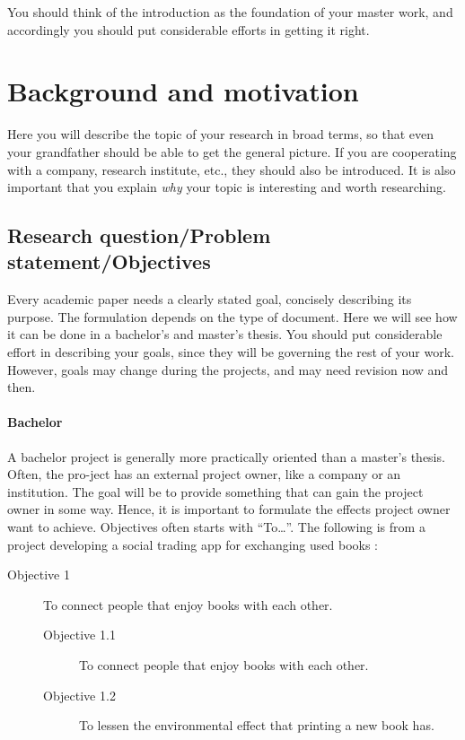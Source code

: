 You should think of the introduction  as the foundation of your master work, and accordingly you should put considerable efforts in getting it right. 


\section{Background and motivation}
\label{sec:background-motivation}

Here you will describe the topic of your research in broad terms, so that even your grandfather should be able to get the general picture. If you are cooperating with a company, research institute, etc., they should also be introduced. It is also important that you explain {\em why} your topic is interesting and worth researching.

\lipsum[11-14]


\subsection{Research question/Problem statement/Objectives}
\label{sec:research-question}

Every academic paper needs a clearly stated goal, concisely describing its purpose. The formulation depends on the type of document. Here we will see how it can be done in a bachelor’s and master’s thesis. You should put considerable effort in describing your goals, since they will be governing the rest of your work. However, goals may change during the projects, and may need revision now and then.

\paragraph{Bachelor}

A bachelor project is generally more practically oriented than a master’s thesis. Often, the pro-ject has an external project owner, like a company or an institution. The goal will be to provide something that can gain the project owner in some way. Hence, it is important to formulate the effects project owner want to achieve. Objectives often starts with “To\dots”.
The following is from a project developing a social trading app for exchanging used books \cite{akeriversen20bah}:

\begin{description}
\item [Objective 1] To connect people that enjoy books with each other.
    \begin{description}
    \item [Objective 1.1] To connect people that enjoy books with each other.
    \item [Objective 1.2] To lessen the environmental effect that printing a new book has.
    \end{description}
\end{description}

